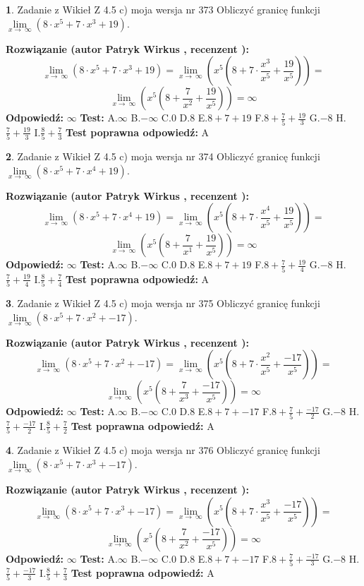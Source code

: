 \documentclass[12pt, a4paper]{article}
\theoremstyle{definition} %
\newtheorem{zad}{}
\newcommand{\zadStart}[1]{\begin{zad}#1\newline}
\newcommand{\zadStop}{\end{zad}}
\newcommand{\rozwStart}[2]{\noindent \textbf{Rozwiązanie (autor #1 , recenzent #2): }\newline}
\newcommand{\rozwStop}{\newline}
\newcommand{\odpStart}{\noindent \textbf{Odpowiedź:}\newline}
\newcommand{\odpStop}{\newline}
\newcommand{\testStart}{\noindent \textbf{Test:}\newline}
\newcommand{\testStop}{\newline}
\newcommand{\kluczStart}{\noindent \textbf{Test poprawna odpowiedź:}\newline}
\newcommand{\kluczStop}{\newline}
\begin{document}
\zadStart{Zadanie z Wikieł Z 4.5 c) moja wersja nr 373}
Obliczyć granicę funkcji  $\lim\limits_{x\to\ \infty}(8 \cdot x^{5}+7 \cdot x^{3}+19)$.
\zadStop
\rozwStart{Patryk Wirkus}{}
$$\lim\limits_{x\to\ \infty}(8 \cdot x^{5}+7 \cdot x^{3}+19) = \lim\limits_{x\to\ \infty}(x^{5}(8 +7 \cdot \frac{x^{3}}{x^{5}}+\frac{19}{x^{5}})) =$$ $$\lim\limits_{x\to\ \infty}(x^{5}(8 +\frac{7}{x^{2}}+\frac{19}{x^{5}})) =\infty$$
\rozwStop
\odpStart
$\infty$
\odpStop
\testStart
A.$\infty$ B.$-\infty$ C.$0$ D.$8$ E.$8 + 7 + 19$
F.$8+\frac{7}{5}+\frac{19}{3}$ G.$-8$
H.$\frac{7}{5}+\frac{19}{3}$
I.$\frac{8}{5}+\frac{7}{3}$
\testStop
\kluczStart
A
\kluczStop



\zadStart{Zadanie z Wikieł Z 4.5 c) moja wersja nr 374}
Obliczyć granicę funkcji  $\lim\limits_{x\to\ \infty}(8 \cdot x^{5}+7 \cdot x^{4}+19)$.
\zadStop
\rozwStart{Patryk Wirkus}{}
$$\lim\limits_{x\to\ \infty}(8 \cdot x^{5}+7 \cdot x^{4}+19) = \lim\limits_{x\to\ \infty}(x^{5}(8 +7 \cdot \frac{x^{4}}{x^{5}}+\frac{19}{x^{5}})) =$$ $$\lim\limits_{x\to\ \infty}(x^{5}(8 +\frac{7}{x^{1}}+\frac{19}{x^{5}})) =\infty$$
\rozwStop
\odpStart
$\infty$
\odpStop
\testStart
A.$\infty$ B.$-\infty$ C.$0$ D.$8$ E.$8 + 7 + 19$
F.$8+\frac{7}{5}+\frac{19}{4}$ G.$-8$
H.$\frac{7}{5}+\frac{19}{4}$
I.$\frac{8}{5}+\frac{7}{4}$
\testStop
\kluczStart
A
\kluczStop



\zadStart{Zadanie z Wikieł Z 4.5 c) moja wersja nr 375}
Obliczyć granicę funkcji  $\lim\limits_{x\to\ \infty}(8 \cdot x^{5}+7 \cdot x^{2}+-17)$.
\zadStop
\rozwStart{Patryk Wirkus}{}
$$\lim\limits_{x\to\ \infty}(8 \cdot x^{5}+7 \cdot x^{2}+-17) = \lim\limits_{x\to\ \infty}(x^{5}(8 +7 \cdot \frac{x^{2}}{x^{5}}+\frac{-17}{x^{5}})) =$$ $$\lim\limits_{x\to\ \infty}(x^{5}(8 +\frac{7}{x^{3}}+\frac{-17}{x^{5}})) =\infty$$
\rozwStop
\odpStart
$\infty$
\odpStop
\testStart
A.$\infty$ B.$-\infty$ C.$0$ D.$8$ E.$8 + 7 + -17$
F.$8+\frac{7}{5}+\frac{-17}{2}$ G.$-8$
H.$\frac{7}{5}+\frac{-17}{2}$
I.$\frac{8}{5}+\frac{7}{2}$
\testStop
\kluczStart
A
\kluczStop



\zadStart{Zadanie z Wikieł Z 4.5 c) moja wersja nr 376}
Obliczyć granicę funkcji  $\lim\limits_{x\to\ \infty}(8 \cdot x^{5}+7 \cdot x^{3}+-17)$.
\zadStop
\rozwStart{Patryk Wirkus}{}
$$\lim\limits_{x\to\ \infty}(8 \cdot x^{5}+7 \cdot x^{3}+-17) = \lim\limits_{x\to\ \infty}(x^{5}(8 +7 \cdot \frac{x^{3}}{x^{5}}+\frac{-17}{x^{5}})) =$$ $$\lim\limits_{x\to\ \infty}(x^{5}(8 +\frac{7}{x^{2}}+\frac{-17}{x^{5}})) =\infty$$
\rozwStop
\odpStart
$\infty$
\odpStop
\testStart
A.$\infty$ B.$-\infty$ C.$0$ D.$8$ E.$8 + 7 + -17$
F.$8+\frac{7}{5}+\frac{-17}{3}$ G.$-8$
H.$\frac{7}{5}+\frac{-17}{3}$
I.$\frac{8}{5}+\frac{7}{3}$
\testStop
\kluczStart
A
\kluczStop
\end{document}
